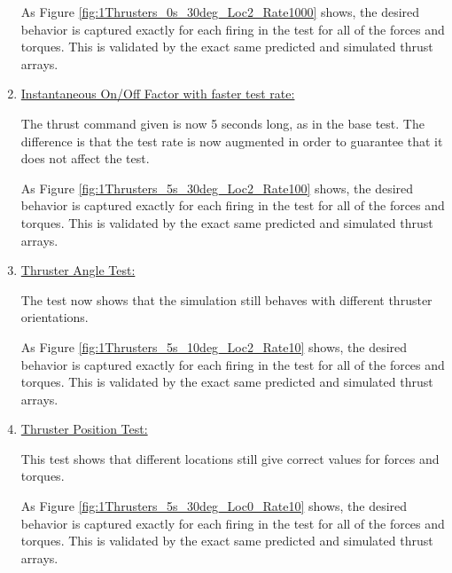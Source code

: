 \begin{enumerate}
	As Figure \ref{fig:1Thrusters_0s_30deg_Loc2_Rate1000} shows, the desired behavior is captured exactly for each 
	firing in the test for all of the forces and torques. This is validated by the exact same predicted and simulated thrust arrays. 
	
	\item{\underline{Instantaneous On/Off Factor with faster test rate:} }
	
	
	
	The thrust command given is now 5 seconds long, as in the base test. The difference is that the test rate is now augmented in order to guarantee that it does not affect the test.
	
	
	
	As Figure \ref{fig:1Thrusters_5s_30deg_Loc2_Rate100} shows, the desired behavior is captured exactly for each 
	firing in the test for all of the forces and torques. This is validated by the exact same predicted and simulated thrust arrays. 
	
	\item{\underline{Thruster Angle Test:}}
	
	
	
	The test now shows that the simulation still behaves with different thruster orientations.
	
	
	
	As Figure \ref{fig:1Thrusters_5s_10deg_Loc2_Rate10} shows, the desired behavior is captured exactly for each 
	firing in the test for all of the forces and torques. This is validated by the exact same predicted and simulated thrust arrays. 
	
	
	\item{\underline{Thruster Position Test:} }
	
	
	
	This test shows that different locations still give correct values for forces and torques.
	
	
	
	As Figure \ref{fig:1Thrusters_5s_30deg_Loc0_Rate10} shows, the desired behavior is captured exactly for each 
	firing in the test for all of the forces and torques. This is validated by the exact same predicted and simulated thrust arrays. 
	

\end{enumerate}

